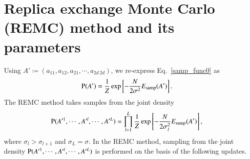 \documentclass[preprint,
bibnotes,
 amsmath,amssymb,
 aps,
]{revtex4-1}
\begin{document}
\section{Replica exchange Monte Carlo (REMC) method and its parameters}
\label{remc_params}
Using $A' \coloneqq (a_{11},a_{12},a_{21},\cdots,a_{2d\:2d})$, we re-express Eq.~\eqref{samp_func0} as
\begin{equation}
{\rm P}(A') = \frac{1}{Z} \exp\left[-\frac{N}{2\sigma^2} E_{\rm samp}(A')\right]. 
\end{equation}
The REMC method takes samples from the joint density 
  \begin{equation}
{\rm  P}(A'^1,\cdots,A'^l,\cdots, A'^L)=\prod_{l=1}^L\frac{1}{Z} \exp\left[-\frac{N}{2\sigma_l^2} E_{\rm samp}(A')\right],
\end{equation}
where $\sigma_l>\sigma_{l+1}$ and $\sigma_L = \sigma$. 
In the REMC method, sampling from the joint density ${\rm  P}(A'^1,\cdots,A'^l,\cdots, A'^L)$ is performed on the basis of the following updates.
 \\
\end{document}
